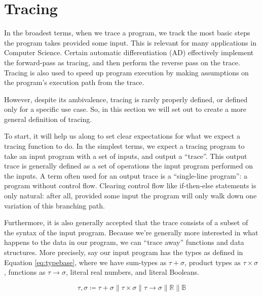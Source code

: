 \section{Tracing}
    In the broadest terms, when we trace a program, we track the most basic steps the program takes provided some input.
    This is relevant for many applications in Computer Science.
    Certain automatic differentiation (AD) effectively implement the forward-pass as tracing, and then perform the reverse pass on the trace\cn.
    Tracing is also used to speed up program execution by making assumptions on the program's execution path from the trace\cn.

    However, despite its ambivalence, tracing is rarely properly defined, or defined only for a specific use case.
    So, in this section we will set out to create a more general definition of tracing.
    
    To start, it will help us along to set clear expectations for what we expect a tracing function to do.
    In the simplest terms, we expect a tracing program to take an input program with a set of inputs, and output a ``trace''.
    This output trace is generally defined as a set of operations the input program performed on the inputs.
    A term often used for an output trace is a ``single-line program''\cn: a program without control flow.
    Clearing control flow like if-then-else statements is only natural: after all, provided some input the program will only walk down one variation of this branching path.

    Furthermore, it is also generally accepted that the trace consists of a subset of the syntax of the input program.
    Because we're generally more interested in what happens to the data in our program, we can ``trace away'' functions and data structures.
    More precisely, say our input program has the types as defined in Equation \ref{eq:typebase}, where we have sum-types as $\tau+\sigma$, product types as $\tau\times\sigma$, functions as $\tau\to\sigma$, literal real numbers, and literal Booleans.

    \begin{equation}
        \label{eq:typebase}
        \tau,\sigma\coloneqq\tau+\sigma\|\tau\times\sigma\|\tau\to\sigma\|\mathbb{R}\|\mathbb{B}
    \end{equation}

